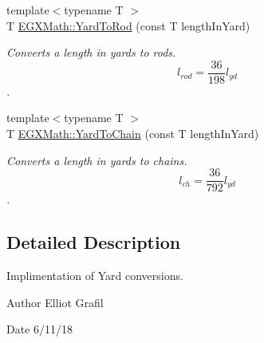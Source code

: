 \begin{DoxyCompactItemize}
{\footnotesize template$<$typename T $>$ }\\T \mbox{\hyperlink{group___e_g_x_math-_conversions-_length_conversions-_imperial-_yard-_surveyors_ga5c59ea68e354d48288451d711d68824f}{E\+G\+X\+Math\+::\+Yard\+To\+Rod}} (const T length\+In\+Yard)
\begin{DoxyCompactList}\small\item\em Converts a length in yards to rods. \[ l_{rod}= \frac{36}{198} l_{yd} \]. \end{DoxyCompactList}\item 
{\footnotesize template$<$typename T $>$ }\\T \mbox{\hyperlink{group___e_g_x_math-_conversions-_length_conversions-_imperial-_yard-_surveyors_ga057832281ac79e2226f88f90810047cf}{E\+G\+X\+Math\+::\+Yard\+To\+Chain}} (const T length\+In\+Yard)
\begin{DoxyCompactList}\small\item\em Converts a length in yards to chains. \[ l_{ch}= \frac{36}{792} l_{yd} \]. \end{DoxyCompactList}\end{DoxyCompactItemize}


\subsection{Detailed Description}
Implimentation of Yard conversions. 

\begin{DoxyAuthor}{Author}
Elliot Grafil 
\end{DoxyAuthor}
\begin{DoxyDate}{Date}
6/11/18 
\end{DoxyDate}
